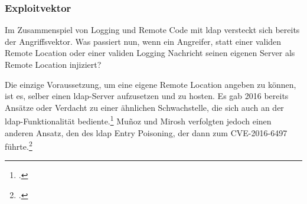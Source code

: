 
\subsubsection{Exploitvektor}
Im Zusammenspiel von Logging und Remote Code mit \gls{ldap} versteckt sich bereits der Angriffsvektor.
Was passiert nun, wenn ein Angreifer, statt einer validen Remote Location oder einer validen Logging Nachricht seinen eigenen Server als Remote Location injiziert?

Die einzige Voraussetzung, um eine eigene Remote Location angeben zu können, ist es, selber einen \gls{ldap}-Server aufzusetzen und zu hosten.
Es gab 2016 bereits Ansätze oder Verdacht zu einer ähnlichen Schwachstelle, die sich auch an der \gls{ldap}-Funktionalität bediente.\footcite{blackhatPresentation}
Muñoz und Mirosh verfolgten jedoch einen anderen Ansatz, den des \gls{ldap} Entry Poisoning, der dann zum CVE-2016-6497 führte.\footcite{cve2016}
